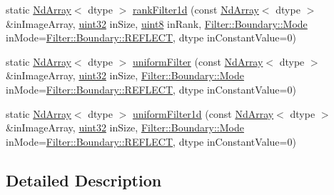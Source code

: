 \begin{DoxyCompactItemize}
\item 
static \mbox{\hyperlink{class_num_cpp_1_1_nd_array}{Nd\+Array}}$<$ dtype $>$ \mbox{\hyperlink{class_num_cpp_1_1_filters_a6be9872f0f62734e6b34ac2f9eb8cca9}{rank\+Filter1d}} (const \mbox{\hyperlink{class_num_cpp_1_1_nd_array}{Nd\+Array}}$<$ dtype $>$ \&in\+Image\+Array, \mbox{\hyperlink{namespace_num_cpp_a36f388e948380413c63011cab9b7fbd5}{uint32}} in\+Size, \mbox{\hyperlink{namespace_num_cpp_aee396d0469d6031cd18118c0a45bcdda}{uint8}} in\+Rank, \mbox{\hyperlink{struct_num_cpp_1_1_filter_1_1_boundary_a3fb520b67d524104db12ceef41adf081}{Filter\+::\+Boundary\+::\+Mode}} in\+Mode=\mbox{\hyperlink{struct_num_cpp_1_1_filter_1_1_boundary_a3fb520b67d524104db12ceef41adf081ad0d71a6dafb7ae1e96441e3f9f7aced8}{Filter\+::\+Boundary\+::\+R\+E\+F\+L\+E\+CT}}, dtype in\+Constant\+Value=0)
\item 
static \mbox{\hyperlink{class_num_cpp_1_1_nd_array}{Nd\+Array}}$<$ dtype $>$ \mbox{\hyperlink{class_num_cpp_1_1_filters_a69d706ac982b2e50be55e4aee492b427}{uniform\+Filter}} (const \mbox{\hyperlink{class_num_cpp_1_1_nd_array}{Nd\+Array}}$<$ dtype $>$ \&in\+Image\+Array, \mbox{\hyperlink{namespace_num_cpp_a36f388e948380413c63011cab9b7fbd5}{uint32}} in\+Size, \mbox{\hyperlink{struct_num_cpp_1_1_filter_1_1_boundary_a3fb520b67d524104db12ceef41adf081}{Filter\+::\+Boundary\+::\+Mode}} in\+Mode=\mbox{\hyperlink{struct_num_cpp_1_1_filter_1_1_boundary_a3fb520b67d524104db12ceef41adf081ad0d71a6dafb7ae1e96441e3f9f7aced8}{Filter\+::\+Boundary\+::\+R\+E\+F\+L\+E\+CT}}, dtype in\+Constant\+Value=0)
\item 
static \mbox{\hyperlink{class_num_cpp_1_1_nd_array}{Nd\+Array}}$<$ dtype $>$ \mbox{\hyperlink{class_num_cpp_1_1_filters_a29b685f383ddecbfac2a5b67de7592ba}{uniform\+Filter1d}} (const \mbox{\hyperlink{class_num_cpp_1_1_nd_array}{Nd\+Array}}$<$ dtype $>$ \&in\+Image\+Array, \mbox{\hyperlink{namespace_num_cpp_a36f388e948380413c63011cab9b7fbd5}{uint32}} in\+Size, \mbox{\hyperlink{struct_num_cpp_1_1_filter_1_1_boundary_a3fb520b67d524104db12ceef41adf081}{Filter\+::\+Boundary\+::\+Mode}} in\+Mode=\mbox{\hyperlink{struct_num_cpp_1_1_filter_1_1_boundary_a3fb520b67d524104db12ceef41adf081ad0d71a6dafb7ae1e96441e3f9f7aced8}{Filter\+::\+Boundary\+::\+R\+E\+F\+L\+E\+CT}}, dtype in\+Constant\+Value=0)
\end{DoxyCompactItemize}


\subsection{Detailed Description}
